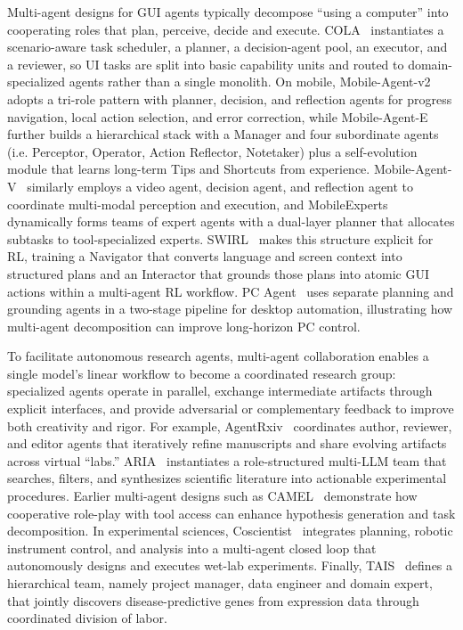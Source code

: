 Multi-agent designs for GUI agents typically decompose “using a computer” into cooperating roles that plan, perceive, decide and execute. COLA~\cite{zhao2025cola} instantiates a scenario-aware task scheduler, a planner, a decision-agent pool, an executor, and a reviewer, so UI tasks are split into basic capability units and routed to domain-specialized agents rather than a single monolith. On mobile, Mobile-Agent-v2~\cite{wang2024mobile} adopts a tri-role pattern with planner, decision, and reflection agents for progress navigation, local action selection, and error correction, while Mobile-Agent-E~\cite{wang2025mobileagente} further builds a hierarchical stack with a Manager and four subordinate agents (i.e. Perceptor, Operator, Action Reflector, Notetaker) plus a self-evolution module that learns long-term Tips and Shortcuts from experience. Mobile-Agent-V~\cite{wang2025mobileagentvvideoguidedapproacheffortless} similarly employs a video agent, decision agent, and reflection agent to coordinate multi-modal perception and execution, and MobileExperts~\cite{zhang2024mobileexperts} dynamically forms teams of expert agents with a dual-layer planner that allocates subtasks to tool-specialized experts. SWIRL~\cite{lu2025swirl} makes this structure explicit for RL, training a Navigator that converts language and screen context into structured plans and an Interactor that grounds those plans into atomic GUI actions within a multi-agent RL workflow. PC Agent~\cite{liu2025pc} uses separate planning and grounding agents in a two-stage pipeline for desktop automation, illustrating how multi-agent decomposition can improve long-horizon PC control. 

To facilitate autonomous research agents, multi-agent collaboration enables a single model’s linear workflow to become a coordinated research group: specialized agents operate in parallel, exchange intermediate artifacts through explicit interfaces, and provide adversarial or complementary feedback to improve both creativity and rigor. For example, AgentRxiv~\cite{schmidgall2025agentrxivcollaborativeautonomousresearch} coordinates author, reviewer, and editor agents that iteratively refine manuscripts and share evolving artifacts across virtual “labs.” ARIA~\cite{ramirezmedina2025acceleratingscientificresearchmultillm} instantiates a role-structured multi-LLM team that searches, filters, and synthesizes scientific literature into actionable experimental procedures. Earlier multi-agent designs such as CAMEL~\cite{qi2023largelanguagemodelszero} demonstrate how cooperative role-play with tool access can enhance hypothesis generation and task decomposition. In experimental sciences, Coscientist~\cite{boiko2023autonomous} integrates planning, robotic instrument control, and analysis into a multi-agent closed loop that autonomously designs and executes wet-lab experiments. Finally, TAIS~\cite{liu2024toward} defines a hierarchical team, namely project manager, data engineer and domain expert, that jointly discovers disease-predictive genes from expression data through coordinated division of labor.
